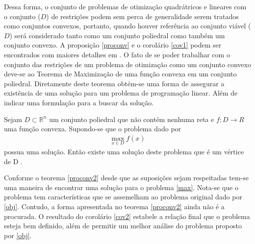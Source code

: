   Dessa forma, o  conjunto de problemas de otimiza\c c\~ao quadr\'atricos
 e lineares com o conjunto ($D$) de restri\c c\~oes podem sem perca de generalidade serem tratados como conjuntos
 convexos, portanto, quando houver refer\^encia ao conjunto vi\'avel ($D$) ser\'a considerado tanto como um conjunto poliedral
 como tamb\'em um conjunto convexo. 
 A proposi\c c\~ao \autoref{proconv} e o corol\'ario \autoref{cov1} podem ser encontrados com maiores detalhes em \cite{alexey}. 
 O fato de se poder trabalhar com o conjunto 
 das restri\c c\~oes de um problema de otimiza\c c\~ao como um conjunto convexo deve-se ao Teorema de Maximiza\c c\~ao de uma fun\c c\~ao 
 convexa em um conjunto poliedral. Diretamente deste teorema obt\'em-se uma forma de assegurar a 
 exist\^encia de uma solu\c c\~ao para um problema de programa\c c\~ao linear. Al\'em de indicar uma formula\c c\~ao
 para a buscar da  solu\c c\~ao. 
  	\begin{teo}%
	 	\label{proconv2}
	 	Sejam $D \subset \mathbb{R}^n$ um conjunto poliedral que n\~ao cont\'em nenhuma reta e $f: D \rightarrow R$ uma
	 	fun\c c\~ao convexa. Supondo-se que o problema dado por
	 		\begin{align}
		 		\label{max}
		 		\max_{x \in D} f(x) 
	 		\end{align}
	 	possua uma solu\c c\~ao.
	 	Ent\~ao existe uma solu\c c\~ao deste problema que \'e um v\'ertice de D \cite{alexey}.
 	\end{teo}
 Conforme o teorema \autoref{proconv2} desde que as suposi\c c\~oes sejam respeitadas tem-se uma maneira de encontrar uma
 solu\c c\~ao para o problema \ref{max}. Nota-se que o problema tem caracter\'isticas que se assemelham ao problema
 original dado por \ref{obj}. Contudo, a forma apresentada no teorema \autoref{proconv2} ainda n\~ao \'e a procurada. O
 resultado do corol\'ario \autoref{cov2} estabele a rela\c c\~ao final que o problema esteja bem definido, al\'em de
 permitir um melhor an\'alise do problema proposto por \ref{obj}.
